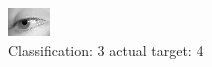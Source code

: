 \begin{figure}[h!]
\begin{center}
\includegraphics[width=0.60\columnwidth]{figures/ID2930_class_3_target_4.png}
\end{center}
\caption{ Classification: 3 actual target: 4}
\label{fig:ID2930_class_3_target_4}
\end{figure}
